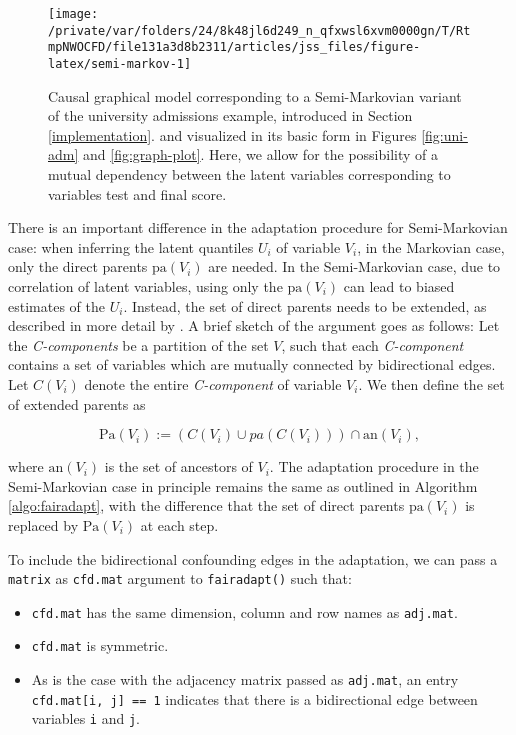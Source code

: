\documentclass[
  nojss]{jss}
\providecommand{\tightlist}{%
  \setlength{\itemsep}{0pt}\setlength{\parskip}{0pt}}
\begin{document}
\begin{CodeChunk}
\begin{figure}

{\centering \texttt{[image: /private/var/folders/24/8k48jl6d249\_n\_qfxwsl6xvm0000gn/T/RtmpNWOCFD/file131a3d8b2311/articles/jss\_files/figure-latex/semi-markov-1]} 

}

\caption{Causal graphical model corresponding to a Semi-Markovian variant of the university admissions example, introduced in Section \ref{implementation}.  and visualized in its basic form in Figures \ref{fig:uni-adm} and \ref{fig:graph-plot}. Here, we allow for the possibility of a mutual dependency between the latent variables corresponding to variables test and final score.}\label{fig:semi-markov}
\end{figure}
\end{CodeChunk}

There is an important difference in the adaptation procedure for
Semi-Markovian case: when inferring the latent quantiles \(U_i\) of
variable \(V_i\), in the Markovian case, only the direct parents
\(\mathrm{pa}(V_i)\) are needed. In the Semi-Markovian case, due to
correlation of latent variables, using only the \(\mathrm{pa}(V_i)\) can
lead to biased estimates of the \(U_i\). Instead, the set of direct
parents needs to be extended, as described in more detail by
\citet{tian2002general}. A brief sketch of the argument goes as follows:
Let the \emph{C-components} be a partition of the set \(V\), such that
each \emph{C-component} contains a set of variables which are mutually
connected by bidirectional edges. Let \(C(V_i)\) denote the entire
\emph{C-component} of variable \(V_i\). We then define the set of
extended parents as

\[\mathrm{Pa}(V_i) := (C(V_i) \cup pa(C(V_i))) \cap \mathrm{an}(V_i),\]

where \(\mathrm{an}(V_i)\) is the set of ancestors of \(V_i\). The
adaptation procedure in the Semi-Markovian case in principle remains the
same as outlined in Algorithm \ref{algo:fairadapt}, with the difference
that the set of direct parents \(\mathrm{pa}(V_i)\) is replaced by
\(\mathrm{Pa}(V_i)\) at each step.

To include the bidirectional confounding edges in the adaptation, we can
pass a \texttt{matrix} as \texttt{cfd.mat} argument to
\texttt{fairadapt()} such that:

\begin{itemize}
\tightlist
\item
  \texttt{cfd.mat} has the same dimension, column and row names as
  \texttt{adj.mat}.
\item
  \texttt{cfd.mat} is symmetric.
\item
  As is the case with the adjacency matrix passed as \texttt{adj.mat},
  an entry \texttt{cfd.mat{[}i,\ j{]}\ ==\ 1} indicates that there is a
  bidirectional edge between variables \texttt{i} and \texttt{j}.
\end{itemize}
\end{document}
